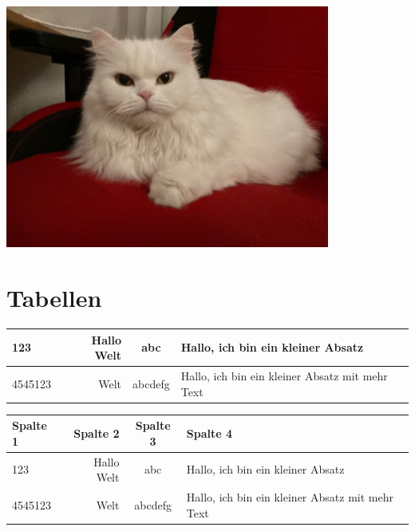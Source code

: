 \documentclass[ngerman,12pt,parskip=half]{scrreprt}
\begin{document}
\begin{center}
\includegraphics[width=0.8\textwidth]{Bilder/Katze.jpg}
\label{fig:katze}
\end{center}

\clearpage %

\section{Tabellen}

\begin{center}
\label{tab:erstetabelle}
\begin{tabular}{|l|r|c|p{5cm}|} \hline
123 & Hallo Welt & abc & Hallo, ich bin ein kleiner Absatz \\ \hline
4545123 & Welt & abcdefg & Hallo, ich bin ein kleiner Absatz mit mehr Text \\ \hline
\end{tabular}
\end{center}

\begin{center}
\label{tab:erstetabelle}
\begin{tabular}{lrcp{5cm}} \\ \toprule[2pt]
\textbf{Spalte 1} & \textbf{Spalte 2}  & \textbf{Spalte 3}  & \textbf{Spalte 4}  \\ \midrule[1pt]
123 & Hallo Welt & abc & Hallo, ich bin ein kleiner Absatz \\ 
4545123 & Welt & abcdefg & Hallo, ich bin ein kleiner Absatz mit mehr Text \\ \bottomrule[4pt]
\end{tabular}
\end{center}
\end{document}
